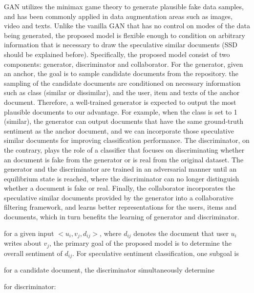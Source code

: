 \documentclass[3p,review]{elsarticle}
\begin{document}
GAN utilizes the minimax game theory to generate plausible fake data samples, and has been commonly applied in data augmentation areas such as images, video and texts. Unlike the vanilla GAN that has no control on modes of the data being generated, the proposed model is flexible enough to condition on arbitrary information that is necessary to draw the speculative similar documents (SSD should be explained before). Specifically, the proposed model consist of two components: generator, discriminator and collaborator. For the generator, given an anchor, the goal is to sample candidate documents from the repository. the sampling of the candidate documents are conditioned on necessary information such as class (similar or dissimilar), and the user, item and texts of the anchor document. Therefore, a well-trained generator is expected to output the most plausible documents to our advantage. For example, when the class is set to 1 (similar), the generator can output documents that have the same ground-truth sentiment as the anchor document, and we can incorporate those speculative similar documents for improving classification performance. The discriminator, on the contrary, plays the role of a classifier that focuses on discriminating whether an document is fake from the generator or is real from the original dataset. The generator and the discriminator are trained in an adversarial manner until an equilibrium state is reached, where the discriminator can no longer distinguish whether a document is fake or real. Finally, the collaborator incorporates the speculative similar documents provided by the generator into a collaborative filtering framework, and learns better representations for the users, items and documents, which in turn benefits the learning of generator and discriminator.


for a given input $<u_i, v_j, d_{ij}>$, where $d_{ij}$ denotes the document that user $u_i$ writes about $v_j$, the primary goal of the proposed model is to determine the overall sentiment of $d_{ij}$. For speculative sentiment classification, one subgoal is



for a candidate document, the discriminator simultaneously determine

for discriminator:
\end{document}
